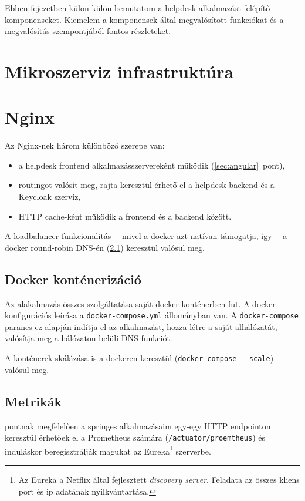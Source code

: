 Ebben  fejezetben külön-külön bemutatom a helpdesk alkalmazást felépítő komponenseket. Kiemelem a komponensek által megvalósított funkciókat és a megvalósítás szempontjából fontos részleteket. 


\section{Mikroszerviz infrastruktúra}

\section{Nginx}\label{sec:nginx}
Az Nginx-nek három különböző szerepe van:

\begin{itemize}
	\item a \foreignlanguage{british}{helpdesk frontend} alkalmazásszervereként működik (\ref{sec:angular}~pont),
	
	\item \foreignlanguage{british}{routing}ot valósít meg, rajta keresztül érhető el a \foreignlanguage{british}{helpdesk backend} és a \foreignlanguage{british}{Keycloak} szerviz,
	
	\item \foreignlanguage{british}{HTTP cache}-ként működik a frontend és a backend között.
\end{itemize}

A loadbalancer funkcionalitás --~mivel a docker azt natívan támogatja, így~-- a \foreignlanguage{british}{docker round-robin DNS}-én (\ref{sec:docker}) keresztül valósul meg.


\subsection{Docker konténerizáció}\label{sec:docker}
Az alakalmazás összes szolgáltatása saját docker konténerben fut. A docker konfigurációs leírása a \texttt{docker-compose.yml} állományban van. A \texttt{docker-compose} parancs ez alapján indítja el az alkalmazást, hozza létre a saját alhálózatát, valósítja meg a hálózaton belüli DNS-funkciót.

A konténerek skálázása is a dockeren keresztül (\texttt{docker-compose ----scale}) valósul meg.


\subsection{Metrikák}\label{sec:metrikak}
 pontnak megfelelően a springes alkalmazásaim egy-egy HTTP endpointon keresztül érhetőek el a Prometheus számára (\texttt{\mbox{/actuator/proemtheus}}) és induláskor beregisztrálják magukat az Eureka\footnote{Az Eureka a Netflix által fejlesztett \emph{discovery server}. Feladata az összes kliens port és ip adatának nyilkvántartása.} szerverbe.

